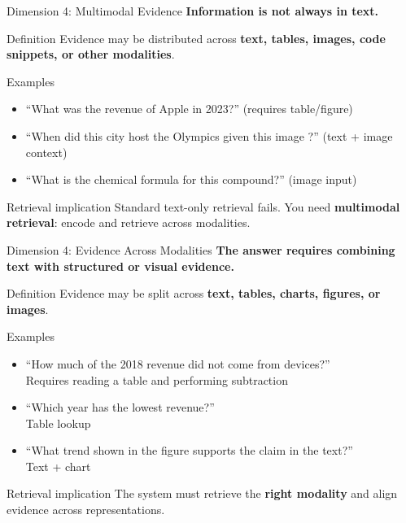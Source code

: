 \documentclass[aspectratio=169, xcolor=table]{beamer}
\newif\ifanimated
\newcommand{\cpause}{\ifanimated\pause\fi}
\begin{document}
\begin{frame}[shrink=10]{Dimension 4: Multimodal Evidence}
\textbf{Information is not always in text.}

\vspace{0.7em}
\begin{block}{Definition}
Evidence may be distributed across \textbf{text, tables, images, code snippets, or other modalities}.
\end{block}

\cpause
\begin{block}{Examples}
\begin{itemize}
  \item ``What was the revenue of Apple in 2023?'' \hfill (requires table/figure)
  \item ``When did this city host the Olympics given this image ?'' \hfill (text + image context)
  \item ``What is the chemical formula for this compound?'' \hfill (image input)
\end{itemize}
\end{block}

\cpause
\begin{block}{Retrieval implication}
Standard text-only retrieval fails.
You need \textbf{multimodal retrieval}: encode and retrieve across modalities.
\end{block}
\end{frame}


\begin{frame}[shrink=10]{Dimension 4: Evidence Across Modalities}
\textbf{The answer requires combining text with structured or visual evidence.}

\vspace{0.7em}
\begin{block}{Definition}
Evidence may be split across \textbf{text, tables, charts, figures, or images}.
\end{block}

\cpause
\begin{block}{Examples}
\begin{itemize}
  \item ``How much of the 2018 revenue did not come from devices?'' \\
  \footnotesize Requires reading a table and performing subtraction
  \item ``Which year has the lowest revenue?'' \\
  \footnotesize Table lookup
  \item ``What trend shown in the figure supports the claim in the text?'' \\
  \footnotesize Text + chart
\end{itemize}
\end{block}

\cpause
\begin{block}{Retrieval implication}
The system must retrieve the \textbf{right modality} and align evidence across representations.
\end{block}
\end{frame}
\end{document}
